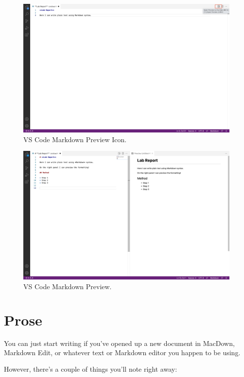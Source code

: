 \documentclass[
]{book}
\begin{document}
\begin{figure}
\centering
\includegraphics{images/vs-code-5.png}
\caption{VS Code Markdown Preview Icon.}
\end{figure}

\begin{figure}
\centering
\includegraphics{images/vs-code-6.png}
\caption{VS Code Markdown Preview.}
\end{figure}

\hypertarget{prose}{%
\section{Prose}\label{prose}}

You can just start writing if you've opened up a new document in MacDown, Markdown Edit, or whatever text or Markdown editor you happen to be using.

However, there's a couple of things you'll note right away:
\end{document}
